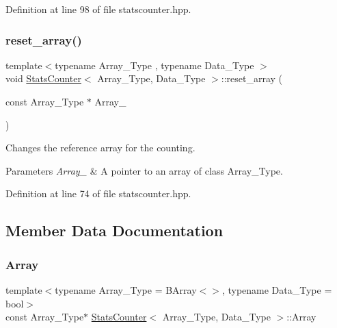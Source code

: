 Definition at line 98 of file statscounter.\+hpp.

\mbox{\label{class_stats_counter_a8dabc3a7a9931acbb76900a67d728f70}} 
\subsubsection{\texorpdfstring{reset\+\_\+array()}{reset\_array()}}
{\footnotesize\ttfamily template$<$typename Array\+\_\+\+Type , typename Data\+\_\+\+Type $>$ \\
void \hyperlink{class_stats_counter}{Stats\+Counter}$<$ Array\+\_\+\+Type, Data\+\_\+\+Type $>$\+::reset\+\_\+array (\begin{DoxyParamCaption}\item[{const Array\+\_\+\+Type $\ast$}]{Array\+\_\+ }\end{DoxyParamCaption})\hspace{0.3cm}{\ttfamily [inline]}}



Changes the reference array for the counting. 


\begin{DoxyParams}{Parameters}
{\em Array\+\_\+} & A pointer to an array of class {\ttfamily Array\+\_\+\+Type}. \\
\hline
\end{DoxyParams}


Definition at line 74 of file statscounter.\+hpp.



\subsection{Member Data Documentation}
\mbox{\label{class_stats_counter_aa826cd748cd3b1a57cbec52424285485}} 
\subsubsection{\texorpdfstring{Array}{Array}}
{\footnotesize\ttfamily template$<$typename Array\+\_\+\+Type = B\+Array$<$$>$, typename Data\+\_\+\+Type = bool$>$ \\
const Array\+\_\+\+Type$\ast$ \hyperlink{class_stats_counter}{Stats\+Counter}$<$ Array\+\_\+\+Type, Data\+\_\+\+Type $>$\+::Array}



